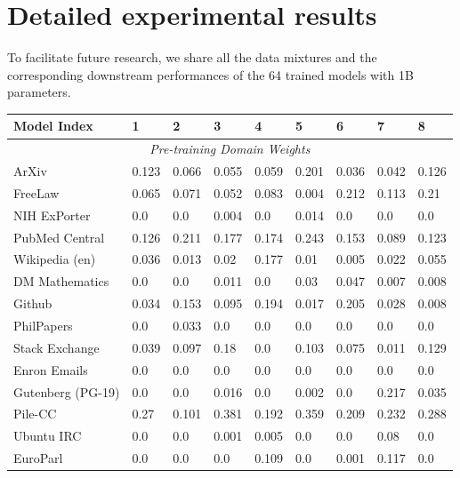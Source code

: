 \section{Detailed experimental results}\label{appendix:all_model_results}

To facilitate future research, we share all the data mixtures and the corresponding downstream performances of the 64 trained models with 1B parameters.

\begin{table}[!ht]
    \centering
    \begin{tabular}{lllllllll}
    \toprule
        \textbf{Model Index} & \textbf{1} & \textbf{2} & \textbf{3} & \textbf{4} & \textbf{5} & \textbf{6} & \textbf{7} & \textbf{8} \\ 
        \midrule
        \multicolumn{9}{c}{\textit{Pre-training Domain Weights}} \\
        ArXiv & 0.123 & 0.066 & 0.055 & 0.059 & 0.201 & 0.036 & 0.042 & 0.126 \\ 
        FreeLaw & 0.065 & 0.071 & 0.052 & 0.083 & 0.004 & 0.212 & 0.113 & 0.21 \\ 
        NIH ExPorter & 0.0 & 0.0 & 0.004 & 0.0 & 0.014 & 0.0 & 0.0 & 0.0 \\ 
        PubMed Central & 0.126 & 0.211 & 0.177 & 0.174 & 0.243 & 0.153 & 0.089 & 0.123 \\ 
        Wikipedia (en) & 0.036 & 0.013 & 0.02 & 0.177 & 0.01 & 0.005 & 0.022 & 0.055 \\ 
        DM Mathematics & 0.0 & 0.0 & 0.011 & 0.0 & 0.03 & 0.047 & 0.007 & 0.008 \\ 
        Github & 0.034 & 0.153 & 0.095 & 0.194 & 0.017 & 0.205 & 0.028 & 0.008 \\ 
        PhilPapers & 0.0 & 0.033 & 0.0 & 0.0 & 0.0 & 0.0 & 0.0 & 0.0 \\ 
        Stack Exchange & 0.039 & 0.097 & 0.18 & 0.0 & 0.103 & 0.075 & 0.011 & 0.129 \\ 
        Enron Emails & 0.0 & 0.0 & 0.0 & 0.0 & 0.0 & 0.0 & 0.0 & 0.0 \\ 
        Gutenberg (PG-19) & 0.0 & 0.0 & 0.016 & 0.0 & 0.002 & 0.0 & 0.217 & 0.035 \\ 
        Pile-CC & 0.27 & 0.101 & 0.381 & 0.192 & 0.359 & 0.209 & 0.232 & 0.288 \\ 
        Ubuntu IRC & 0.0 & 0.0 & 0.001 & 0.005 & 0.0 & 0.0 & 0.08 & 0.0 \\ 
        EuroParl & 0.0 & 0.0 & 0.0 & 0.109 & 0.0 & 0.001 & 0.117 & 0.0 \\ 

\end{tabular}
\end{table}
